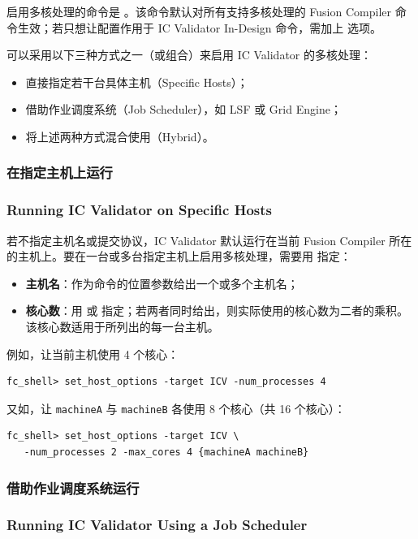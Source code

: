 启用多核处理的命令是 。该命令默认对所有支持多核处理的 Fusion Compiler 命令生效；若只想让配置作用于 IC Validator In-Design 命令，需加上  选项。

可以采用以下三种方式之一（或组合）来启用 IC Validator 的多核处理：
\begin{itemize}
  \item 直接指定若干台具体主机（Specific Hosts）；
  \item 借助作业调度系统（Job Scheduler），如 LSF 或 Grid Engine；
  \item 将上述两种方式混合使用（Hybrid）。
\end{itemize}

\subsubsection{在指定主机上运行}
\subsubsection*{Running IC Validator on Specific Hosts}

若不指定主机名或提交协议，IC Validator 默认运行在当前 Fusion Compiler 所在的主机上。要在一台或多台指定主机上启用多核处理，需要用  指定：
\begin{itemize}
  \item \textbf{主机名}：作为命令的位置参数给出一个或多个主机名；
  \item \textbf{核心数}：用  或  指定；若两者同时给出，则实际使用的核心数为二者的乘积。该核心数适用于所列出的每一台主机。
\end{itemize}

例如，让当前主机使用 4 个核心：
\begin{lstlisting}
fc_shell> set_host_options -target ICV -num_processes 4
\end{lstlisting}

又如，让 \texttt{machineA} 与 \texttt{machineB} 各使用 8 个核心（共 16 个核心）：
\begin{lstlisting}
fc_shell> set_host_options -target ICV \
   -num_processes 2 -max_cores 4 {machineA machineB}
\end{lstlisting}

\subsubsection{借助作业调度系统运行}
\subsubsection*{Running IC Validator Using a Job Scheduler}

